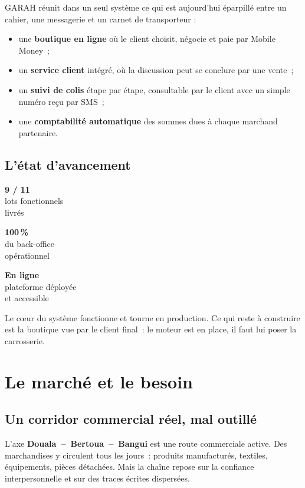 \documentclass[11pt,a4paper]{article}
\newcommand{\chiffre}[2]{%
  \begin{minipage}[t]{0.30\textwidth}
    \centering
    {\Huge\bfseries\color{marque}#1}\\[0.3em]
    {\small\color{gris}#2}
  \end{minipage}%
}
\begin{document}
GARAH réunit dans un seul système ce qui est aujourd'hui éparpillé entre un
cahier, une messagerie et un carnet de transporteur :

\begin{itemize}
  \item une \textbf{boutique en ligne} où le client choisit, négocie et paie
        par Mobile Money~;
  \item un \textbf{service client} intégré, où la discussion peut se conclure
        par une vente~;
  \item un \textbf{suivi de colis} étape par étape, consultable par le client
        avec un simple numéro reçu par SMS~;
  \item une \textbf{comptabilité automatique} des sommes dues à chaque
        marchand partenaire.
\end{itemize}

\subsection*{L'état d'avancement}

\vspace{0.6em}
\noindent
\chiffre{9 / 11}{lots fonctionnels\\livrés}
\hfill
\chiffre{100\,\%}{du back-office\\opérationnel}
\hfill
\chiffre{En ligne}{plateforme déployée\\et accessible}
\vspace{1.2em}

Le cœur du système fonctionne et tourne en production. Ce qui reste à
construire est la boutique vue par le client final~: le moteur est en place,
il faut lui poser la carrosserie.

\newpage
\section{Le marché et le besoin}

\subsection{Un corridor commercial réel, mal outillé}

L'axe \textbf{Douala~--~Bertoua~--~Bangui} est une route commerciale active.
Des marchandises y circulent tous les jours~: produits manufacturés, textiles,
équipements, pièces détachées. Mais la chaîne repose sur la confiance
interpersonnelle et sur des traces écrites dispersées.
\end{document}
